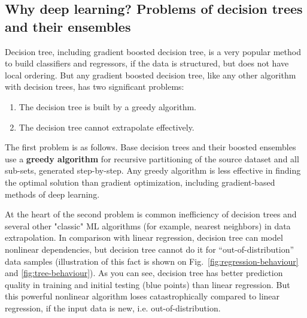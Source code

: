 \documentclass{article}
\begin{document}
\subsection{Why deep learning? Problems of decision trees and their ensembles}

Decision tree, including gradient boosted decision tree, is a very popular method to build classifiers and regressors, if the data is structured, but does not have local ordering. But any gradient boosted decision tree, like any other algorithm with decision trees, has two significant problems:

\begin{enumerate}
    \item The decision tree is built by a greedy algorithm.
    \item The decision tree cannot extrapolate effectively.
\end{enumerate}

The first problem is as follows. Base decision trees \cite{Quinlan1986} and their boosted ensembles \cite{friedman2001} use a \textbf{greedy algorithm} for recursive partitioning of the source dataset and all sub-sets, generated step-by-step. Any greedy algorithm is less effective in finding the optimal solution than gradient optimization, including gradient-based methods of deep learning.

At the heart of the second problem is common inefficiency of decision trees and several other "classic" ML algorithms (for example, nearest neighbors) in data extrapolation. In comparison with linear regression, decision tree can model nonlinear dependencies, but decision tree cannot do it for “out-of-distribution” data samples (illustration of this fact is shown on Fig.~\ref{fig:regression-behaviour} and \ref{fig:tree-behaviour}). As you can see, decision tree has better prediction quality in training and initial testing (blue points) than linear regression. But this powerful nonlinear algorithm loses catastrophically compared to linear regression, if the input data is new, i.e. out-of-distribution.
\end{document}
